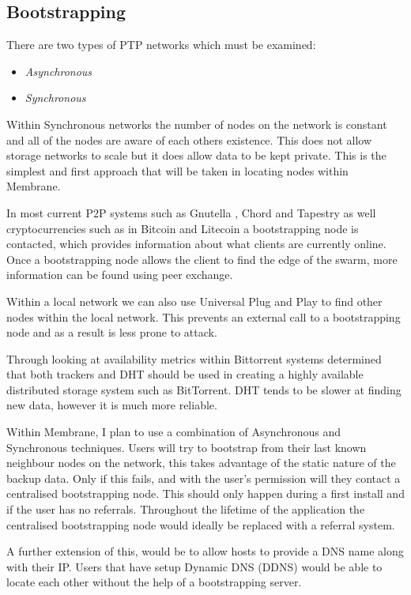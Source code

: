 \documentclass[a4paper, 11pt, twocolumn, twoside]{report}
\begin{document}
\subsection{Bootstrapping}

There are two types of PTP networks which must be examined:
\begin{itemize}
 \item \emph{Asynchronous}
 \item \emph{Synchronous}
\end{itemize}

Within Synchronous networks the number of nodes on the network is constant and all of the nodes are aware of each others existence. This does not allow storage networks to scale but it does allow data to be kept private. \citep{saxena2003admission} This is the simplest and first approach that will be taken in locating nodes within Membrane.

In most current P2P systems such as Gnutella \citep{klingberg2002gnutella}, Chord and Tapestry as well cryptocurrencies such as in Bitcoin and Litecoin a bootstrapping node is contacted, which provides information about what clients are currently online. Once a bootstrapping node allows the client to find the edge of the swarm, more information can be found using peer exchange.

Within a local network we can also use Universal Plug and Play to find other nodes within the local network. This prevents an external call to a bootstrapping node and as a result is less prone to attack.

Through looking at availability metrics within Bittorrent systems \cite{neglia2007availability} determined that both trackers and DHT should be used in creating a highly available distributed storage system such as BitTorrent. DHT tends to be slower at finding new data, however it is much more reliable.

Within Membrane, I plan to use a combination of Asynchronous and Synchronous techniques. Users will try to bootstrap from their last known neighbour nodes on the network, this takes advantage of the static nature of the backup data. Only if this fails, and with the user's permission will they contact a centralised bootstrapping node. This should only happen during a first install and if the user has no referrals. Throughout the lifetime of the application the centralised bootstrapping node would ideally be replaced with a referral system.

A further extension of this, would be to allow hosts to provide a DNS name along with their IP. Users that have setup Dynamic DNS (DDNS) \citep{bound1997dynamic} would be able to locate each other without the help of a bootstrapping server.
\end{document}
